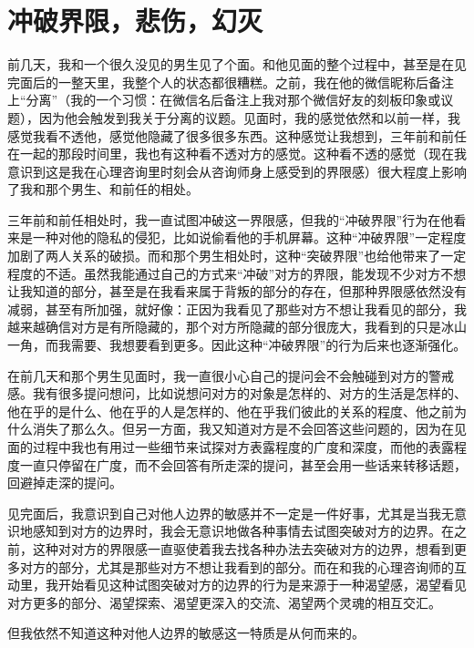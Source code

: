 \chapter{冲破界限，悲伤，幻灭}





前几天，我和一个很久没见的男生见了个面。和他见面的整个过程中，甚至是在见完面后的一整天里，我整个人的状态都很糟糕。之前，我在他的微信昵称后备注上“分离”（我的一个习惯：在微信名后备注上我对那个微信好友的刻板印象或议题），因为他会触发到我关于分离的议题。见面时，我的感觉依然和以前一样，我感觉我看不透他，感觉他隐藏了很多很多东西。这种感觉让我想到，三年前和前任在一起的那段时间里，我也有这种看不透对方的感觉。这种看不透的感觉（现在我意识到这是我在心理咨询里时刻会从咨询师身上感受到的界限感）很大程度上影响了我和那个男生、和前任的相处。

三年前和前任相处时，我一直试图冲破这一界限感，但我的“冲破界限”行为在他看来是一种对他的隐私的侵犯，比如说偷看他的手机屏幕。这种“冲破界限”一定程度加剧了两人关系的破损。而和那个男生相处时，这种“突破界限”也给他带来了一定程度的不适。虽然我能通过自己的方式来“冲破”对方的界限，能发现不少对方不想让我知道的部分，甚至是在我看来属于背叛的部分的存在，但那种界限感依然没有减弱，甚至有所加强，就好像：正因为我看见了那些对方不想让我看见的部分，我越来越确信对方是有所隐藏的，那个对方所隐藏的部分很庞大，我看到的只是冰山一角，而我需要、我想要看到更多。因此这种“冲破界限”的行为后来也逐渐强化。

在前几天和那个男生见面时，我一直很小心自己的提问会不会触碰到对方的警戒感。我有很多提问想问，比如说想问对方的对象是怎样的、对方的生活是怎样的、他在乎的是什么、他在乎的人是怎样的、他在乎我们彼此的关系的程度、他之前为什么消失了那么久。但另一方面，我又知道对方是不会回答这些问题的，因为在见面的过程中我也有用过一些细节来试探对方表露程度的广度和深度，而他的表露程度一直只停留在广度，而不会回答有所走深的提问，甚至会用一些话来转移话题，回避掉走深的提问。

见完面后，我意识到自己对他人边界的敏感并不一定是一件好事，尤其是当我无意识地感知到对方的边界时，我会无意识地做各种事情去试图突破对方的边界。在之前，这种对对方的界限感一直驱使着我去找各种办法去突破对方的边界，想看到更多对方的部分，尤其是那些对方不想让我看到的部分。而在和我的心理咨询师的互动里，我开始看见这种试图突破对方的边界的行为是来源于一种渴望感，渴望看见对方更多的部分、渴望探索、渴望更深入的交流、渴望两个灵魂的相互交汇。

但我依然不知道这种对他人边界的敏感这一特质是从何而来的。

